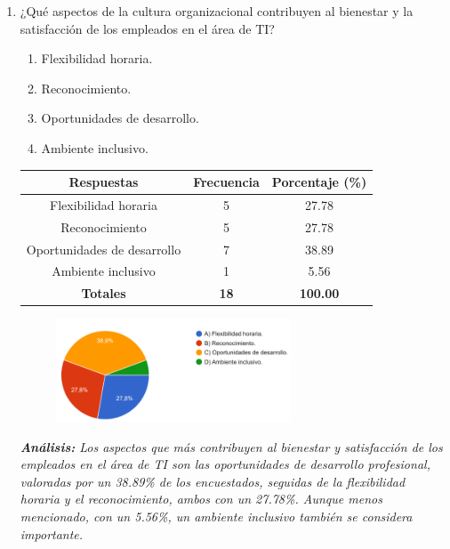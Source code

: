 \documentclass[journal]{IEEEtran}
\begin{document}
\begin{enumerate}
	\item ¿Qué aspectos de la cultura organizacional contribuyen al bienestar y la satisfacción de los empleados en el área de TI?
	\begin{enumerate}
		\item Flexibilidad horaria.
		\item Reconocimiento.
		\item Oportunidades de desarrollo.
		\item Ambiente inclusivo.
	\end{enumerate}
	\begin{table}[H]
	\renewcommand{\arraystretch}{1.3}
	\centering
	\begin{tabular}{|c|c|c|}
		\hline
		\textbf{Respuestas} & \textbf{Frecuencia} & \textbf{Porcentaje (\%)}\\
		\hline
		Flexibilidad horaria & 5 & 27.78\\
		Reconocimiento & 5 & 27.78\\
		Oportunidades de desarrollo & 7 & 38.89\\
		Ambiente inclusivo & 1 & 5.56\\
		\hline
		\textbf{Totales} &\textbf{18}& \textbf{100.00}\\
		\hline
	\end{tabular}
	\end{table}
	\begin{figure}[h]
		\centering
		\includegraphics[width=07cm]{Pregunta21}
	\end{figure}
	\textit{\textbf{Análisis:} Los aspectos que más contribuyen al bienestar y satisfacción de los empleados en el área de TI son las oportunidades de desarrollo profesional, valoradas por un 38.89\% de los encuestados, seguidas de la flexibilidad horaria y el reconocimiento, ambos con un 27.78\%. Aunque menos mencionado, con un 5.56\%, un ambiente inclusivo también se considera importante.}\\
	

\end{enumerate}
\end{document}
